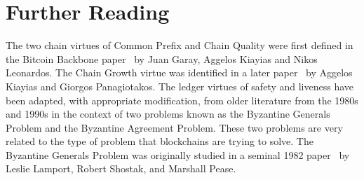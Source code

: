 \section*{Further Reading}
The two chain virtues of Common Prefix and Chain Quality were first defined in the Bitcoin Backbone paper~\cite{backbone}
by Juan Garay, Aggelos Kiayias and Nikos Leonardos. The Chain Growth virtue was identified in a later paper~\cite{speedsecurity}
by Aggelos Kiayias and Giorgos Panagiotakos. The ledger virtues of safety and liveness have been adapted, with appropriate
modification, from older literature from the 1980s and 1990s in the context of two problems known as the Byzantine Generals
Problem and the Byzantine Agreement Problem. These two problems are very related to the type of problem that blockchains
are trying to solve. The Byzantine Generals Problem was originally studied in a seminal 1982 paper~\cite{lamport} by Leslie Lamport,
Robert Shostak, and Marshall Pease.
